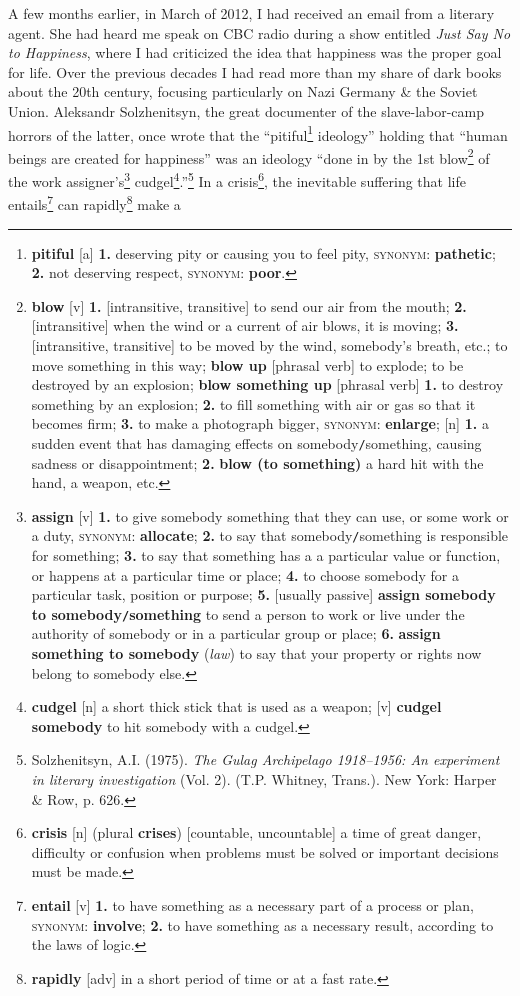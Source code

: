 \documentclass[oneside]{book}
\numberwithin{equation}{section}
\begin{document}
A few months earlier, in March of 2012, I had received an email from a literary agent. She had heard me speak on CBC radio during a show entitled \textit{Just Say No to Happiness}, where I had criticized the idea that happiness was the proper goal for life. Over the previous decades I had read more than my share of dark books about the 20th century, focusing particularly on Nazi Germany \& the Soviet Union. Aleksandr Solzhenitsyn, the great documenter of the slave-labor-camp horrors of the latter, once wrote that the ``pitiful\footnote{\textbf{pitiful} [a] \textbf{1.} deserving pity or causing you to feel pity, \textsc{synonym}: \textbf{pathetic}; \textbf{2.} not deserving respect, \textsc{synonym}: \textbf{poor}.} ideology'' holding that ``human beings are created for happiness'' was an ideology ``done in by the 1st blow\footnote{\textbf{blow} [v] \textbf{1.} [intransitive, transitive] to send our air from the mouth; \textbf{2.} [intransitive] when the wind or a current of air blows, it is moving; \textbf{3.} [intransitive, transitive] to be moved by the wind, somebody's breath, etc.; to move something in this way; \textbf{blow up} [phrasal verb] to explode; to be destroyed by an explosion; \textbf{blow something up} [phrasal verb] \textbf{1.} to destroy something by an explosion; \textbf{2.} to fill something with air or gas so that it becomes firm; \textbf{3.} to make a photograph bigger, \textsc{synonym}: \textbf{enlarge}; [n] \textbf{1.} a sudden event that has damaging effects on somebody\texttt{/}something, causing sadness or disappointment; \textbf{2.} \textbf{blow (to something)} a hard hit with the hand, a weapon, etc.} of the work assigner's\footnote{\textbf{assign} [v] \textbf{1.} to give somebody something that they can use, or some work or a duty, \textsc{synonym}: \textbf{allocate}; \textbf{2.} to say that somebody\texttt{/}something is responsible for something; \textbf{3.} to say that something has a a particular value or function, or happens at a particular time or place; \textbf{4.} to choose somebody for a particular task, position or purpose; \textbf{5.} [usually passive] \textbf{assign somebody to somebody\texttt{/}something} to send a person to work or live under the authority of somebody or in a particular group or place; \textbf{6.} \textbf{assign something to somebody} (\textit{law}) to say that your property or rights now belong to somebody else.} cudgel\footnote{\textbf{cudgel} [n] a short thick stick that is used as a weapon; [v] \textbf{cudgel somebody} to hit somebody with a cudgel.}.''\footnote{Solzhenitsyn, A.I. (1975). \textit{The Gulag Archipelago 1918--1956: An experiment in literary investigation} (Vol. 2). (T.P. Whitney, Trans.). New York: Harper \& Row, p. 626.} In a crisis\footnote{\textbf{crisis} [n] (plural \textbf{crises}) [countable, uncountable] a time of great danger, difficulty or confusion when problems must be solved or important decisions must be made.}, the inevitable suffering that life entails\footnote{\textbf{entail} [v] \textbf{1.} to have something as a necessary part of a process or plan, \textsc{synonym}: \textbf{involve}; \textbf{2.} to have something as a necessary result, according to the laws of logic.} can rapidly\footnote{\textbf{rapidly} [adv] in a short period of time or at a fast rate.} make a 
\end{document}
